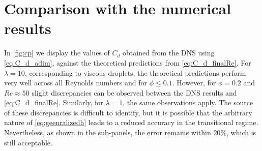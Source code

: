 \section{Comparison with the numerical results}

In \ref{fig:cp} we display the values of $C_d$ obtained from the DNS using \ref{eq:C_d_adim}, against the theoretical predictions from \ref{eq:C_d_finalRe}. 
For $\lambda = 10$, corresponding to viscous droplets, the theoretical predictions perform very well across all Reynolds numbers and for $\phi \le 0.1$. 
However, for $\phi = 0.2$ and $Re \approx 50$ slight discrepancies can be observed between the DNS results and \eqref{eq:C_d_finalRe}. 
Similarly, for $\lambda = 1$, the same observations apply. 
The source of these discrepancies is difficult to identify, but it is possible that the arbitrary nature of \ref{eq:geenralizedh} leads to a reduced accuracy in the transitional regime.
Nevertheless, as shown in the sub-panels, the error remains within $20\%$, which is still acceptable.  

